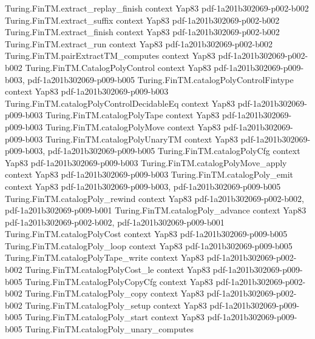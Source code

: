 \begin{theorem}
\proofstep
  {Turing.FinTM.extract_replay_finish}
  {context}
  {Yap83}
  {pdf-1a201b302069-p002-b002}
\proofstep
  {Turing.FinTM.extract_suffix}
  {context}
  {Yap83}
  {pdf-1a201b302069-p002-b002}
\proofstep
  {Turing.FinTM.extract_finish}
  {context}
  {Yap83}
  {pdf-1a201b302069-p002-b002}
\proofstep
  {Turing.FinTM.extract_run}
  {context}
  {Yap83}
  {pdf-1a201b302069-p002-b002}
\proofstep
  {Turing.FinTM.pairExtractTM_computes}
  {context}
  {Yap83}
  {pdf-1a201b302069-p002-b002}
\proofstep
  {Turing.FinTM.CatalogPolyControl}
  {context}
  {Yap83}
  {pdf-1a201b302069-p009-b003,
    pdf-1a201b302069-p009-b005}
\proofstep
  {Turing.FinTM.catalogPolyControlFintype}
  {context}
  {Yap83}
  {pdf-1a201b302069-p009-b003}
\proofstep
  {Turing.FinTM.catalogPolyControlDecidableEq}
  {context}
  {Yap83}
  {pdf-1a201b302069-p009-b003}
\proofstep
  {Turing.FinTM.catalogPolyTape}
  {context}
  {Yap83}
  {pdf-1a201b302069-p009-b003}
\proofstep
  {Turing.FinTM.catalogPolyMove}
  {context}
  {Yap83}
  {pdf-1a201b302069-p009-b003}
\proofstep
  {Turing.FinTM.catalogPolyUnaryTM}
  {context}
  {Yap83}
  {pdf-1a201b302069-p009-b003,
    pdf-1a201b302069-p009-b005}
\proofstep
  {Turing.FinTM.catalogPolyCfg}
  {context}
  {Yap83}
  {pdf-1a201b302069-p009-b003}
\proofstep
  {Turing.FinTM.catalogPolyMove_apply}
  {context}
  {Yap83}
  {pdf-1a201b302069-p009-b003}
\proofstep
  {Turing.FinTM.catalogPoly_emit}
  {context}
  {Yap83}
  {pdf-1a201b302069-p009-b003,
    pdf-1a201b302069-p009-b005}
\proofstep
  {Turing.FinTM.catalogPoly_rewind}
  {context}
  {Yap83}
  {pdf-1a201b302069-p002-b002,
    pdf-1a201b302069-p009-b001}
\proofstep
  {Turing.FinTM.catalogPoly_advance}
  {context}
  {Yap83}
  {pdf-1a201b302069-p002-b002,
    pdf-1a201b302069-p009-b001}
\proofstep
  {Turing.FinTM.catalogPolyCost}
  {context}
  {Yap83}
  {pdf-1a201b302069-p009-b005}
\proofstep
  {Turing.FinTM.catalogPoly_loop}
  {context}
  {Yap83}
  {pdf-1a201b302069-p009-b005}
\proofstep
  {Turing.FinTM.catalogPolyTape_write}
  {context}
  {Yap83}
  {pdf-1a201b302069-p002-b002}
\proofstep
  {Turing.FinTM.catalogPolyCost_le}
  {context}
  {Yap83}
  {pdf-1a201b302069-p009-b005}
\proofstep
  {Turing.FinTM.catalogPolyCopyCfg}
  {context}
  {Yap83}
  {pdf-1a201b302069-p002-b002}
\proofstep
  {Turing.FinTM.catalogPoly_copy}
  {context}
  {Yap83}
  {pdf-1a201b302069-p002-b002}
\proofstep
  {Turing.FinTM.catalogPoly_setup}
  {context}
  {Yap83}
  {pdf-1a201b302069-p009-b005}
\proofstep
  {Turing.FinTM.catalogPoly_start}
  {context}
  {Yap83}
  {pdf-1a201b302069-p009-b005}
\proofstep
  {Turing.FinTM.catalogPoly_unary_computes}

\end{theorem}
